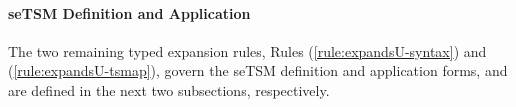 \paragraph{seTSM Definition and Application} The two remaining typed expansion rules, Rules (\ref{rule:expandsU-syntax}) and (\ref{rule:expandsU-tsmap}), govern the seTSM definition and application forms, and are defined in the next two subsections, respectively. 



